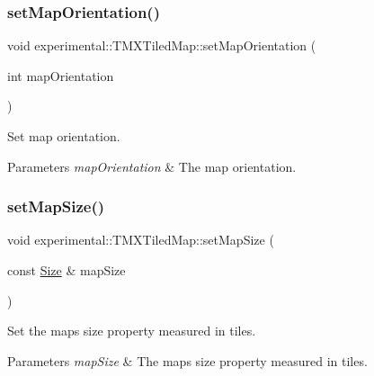 \subsubsection{\texorpdfstring{set\+Map\+Orientation()}{setMapOrientation()}\hspace{0.1cm}{\footnotesize\ttfamily [2/2]}}
{\footnotesize\ttfamily void experimental\+::\+T\+M\+X\+Tiled\+Map\+::set\+Map\+Orientation (\begin{DoxyParamCaption}\item[{int}]{map\+Orientation }\end{DoxyParamCaption})\hspace{0.3cm}{\ttfamily [inline]}}

Set map orientation.


\begin{DoxyParams}{Parameters}
{\em map\+Orientation} & The map orientation. \\
\hline
\end{DoxyParams}
\mbox{\label{classexperimental_1_1TMXTiledMap_a95bc2de4bdd3fe14b4559b81f16aab50}} 
\subsubsection{\texorpdfstring{set\+Map\+Size()}{setMapSize()}\hspace{0.1cm}{\footnotesize\ttfamily [1/2]}}
{\footnotesize\ttfamily void experimental\+::\+T\+M\+X\+Tiled\+Map\+::set\+Map\+Size (\begin{DoxyParamCaption}\item[{const \hyperlink{classSize}{Size} \&}]{map\+Size }\end{DoxyParamCaption})\hspace{0.3cm}{\ttfamily [inline]}}

Set the map\textquotesingle{}s size property measured in tiles.


\begin{DoxyParams}{Parameters}
{\em map\+Size} & The map\textquotesingle{}s size property measured in tiles. \\
\hline
\end{DoxyParams}
\mbox{\label{classexperimental_1_1TMXTiledMap_a95bc2de4bdd3fe14b4559b81f16aab50}} 
